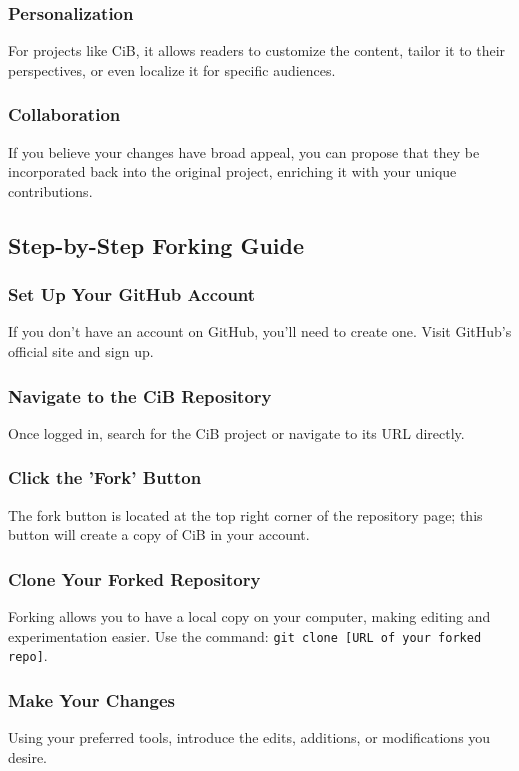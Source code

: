 \documentclass[a4paper,12pt]{book}
\begin{document}
\subsubsection*{Personalization}
For projects like CiB, it allows readers to customize the content, tailor it to their perspectives, or even localize it for specific audiences.

\subsubsection*{Collaboration}
If you believe your changes have broad appeal, you can propose that they be incorporated back into the original project, enriching it with your unique contributions.

\subsection*{Step-by-Step Forking Guide}
\subsubsection*{Set Up Your GitHub Account}
If you don't have an account on GitHub, you'll need to create one. Visit GitHub's official site and sign up.

\subsubsection*{Navigate to the CiB Repository}
Once logged in, search for the CiB project or navigate to its URL directly.

\subsubsection*{Click the 'Fork' Button}
The fork button is located at the top right corner of the repository page; this button will create a copy of CiB in your account.

\subsubsection*{Clone Your Forked Repository}
Forking allows you to have a local copy on your computer, making editing and experimentation easier. Use the command: \texttt{git clone [URL of your forked repo]}.

\subsubsection*{Make Your Changes}
Using your preferred tools, introduce the edits, additions, or modifications you desire.
\end{document}

